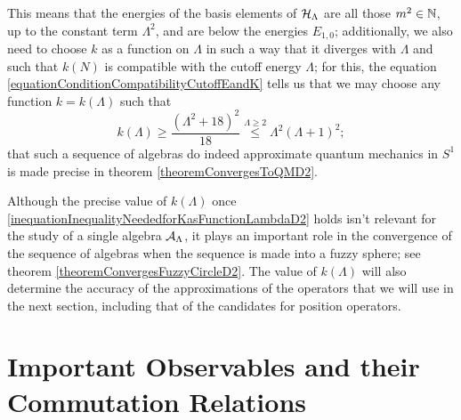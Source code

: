 This means that the energies of the basis elements of $\mathcal H_\Lambda$ are all those $m^2 \in \mathbb{N}$, up to the constant term $\Lambda^2$, and are below the energies $E_{1,0}$; additionally, we also need to choose $k$ as a function on $\Lambda$ in such a way that it diverges with $\Lambda$ and such that $k(N)$ is compatible with the cutoff energy $\Lambda$; for this, the equation \eqref{equationConditionCompatibilityCutoffEandK} tells us that we may choose any function $k = k(\Lambda)$ such that
\begin{equation}\label{inequationInequalityNeededforKasFunctionLambdaD2}
    k(\Lambda) \geq  \frac{\left( {\Lambda^2+18}\right)^2}{18}\overset{\Lambda \geq 2}{\leq} \Lambda^2 (\Lambda + 1)^2;
\end{equation}
that such a sequence of algebras do indeed approximate quantum mechanics in $S^1$ is made precise in theorem \ref{theoremConvergesToQMD2}. 

Although the precise value of $k(\Lambda)$ once \eqref{inequationInequalityNeededforKasFunctionLambdaD2} holds isn't relevant for the study of a single algebra $\mathcal A_\Lambda$, it plays an important role in the convergence of the sequence of algebras when the sequence is made into a fuzzy sphere; see theorem \ref{theoremConvergesFuzzyCircleD2}. The value of $k(\Lambda)$ will also determine the accuracy of the approximations of the operators that we will use in the next section, including that of the candidates for position operators.%


\section{Important Observables and their Commutation Relations}
\label{chNewFuzzySectionObservables}

    
